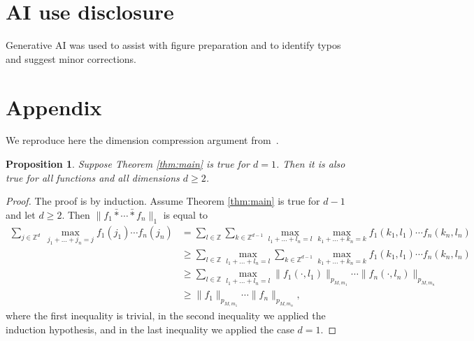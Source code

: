 \documentclass[a4paper,reqno,12pt]{amsart}
\newtheorem{proposition}[theorem]{Proposition}\newtheorem{corollary}[theorem]{Corollary}
\newcommand{\z}{\mathbb{Z}}
\newcommand{\1}{\bo{1}}
\begin{document}
\section*{AI use disclosure}
Generative AI was used to assist with figure preparation and to identify typos and suggest minor corrections.

\section{Appendix}\label{appendix}
We reproduce here the dimension compression argument from~\cite{Be-Iv-Kr-Ma}.


\begin{proposition}
Suppose Theorem \ref{thm:main} is true for $d=1$. Then it is also true for all functions and all dimensions $d\geq 2$.
\end{proposition}
\begin{proof}
The proof is by induction. Assume Theorem \ref{thm:main} is true for $d-1$ and let $d\geq 2$. Then $ \|f_1\bar{*}\cdots \bar{*}f_n\|_1$ is equal to
\begin{align*}
\sum_{j\in\z^d}\ \max_{j_1+\dots +j_n=j} f_1(j_1)\cdots f_n(j_n)  & =  \sum_{l\in \z} \sum_{k\in\z^{d-1}} \max_{l_1+\dots+l_n=l} \max_{k_1+\dots +k_n=k} f_1(k_1,l_1)\cdots f_n(k_n,l_n) \\
& \geq \sum_{l\in \z} \max_{l_1+\dots+l_n=l}  \sum_{k\in\z^{d-1}} \max_{k_1+\dots+ k_n=k} f_1(k_1,l_1)\cdots f_n(k_n,l_n) \\
& \geq \sum_{l\in \z} \max_{l_1+\dots+l_n=l}  \|f_1(\cdot,l_1)\|_{p_{M,m_1}} \cdots \|f_n(\cdot,l_n)\|_{p_{M,m_n}} \\
& \geq  \|f_1\|_{p_{M,m_1}} \cdots \|f_n\|_{p_{M,m_n}},
 \end{align*}
where the first inequality is trivial, in the second inequality we applied the induction hypothesis, and in the last inequality we applied the case $d=1$.
\end{proof}
\end{document}
